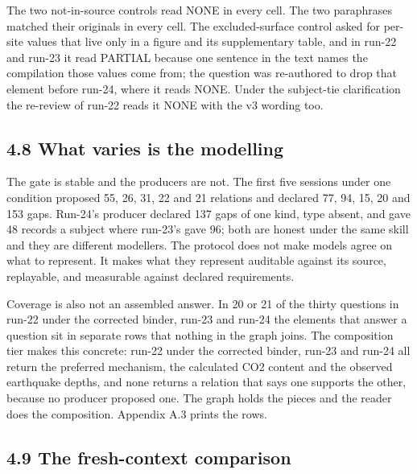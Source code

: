 The two not-in-source controls read NONE in every cell. The two paraphrases matched their originals in every cell. The excluded-surface control asked for per-site values that live only in a figure and its supplementary table, and in run-22 and run-23 it read PARTIAL because one sentence in the text names the compilation those values come from; the question was re-authored to drop that element before run-24, where it reads NONE. Under the subject-tie clarification the re-review of run-22 reads it NONE with the v3 wording too.

\subsection*{4.8 What varies is the modelling}

The gate is stable and the producers are not. The first five sessions under one condition proposed 55, 26, 31, 22 and 21 relations and declared 77, 94, 15, 20 and 153 gaps. Run-24's producer declared 137 gaps of one kind, type absent, and gave 48 records a subject where run-23's gave 96; both are honest under the same skill and they are different modellers. The protocol does not make models agree on what to represent. It makes what they represent auditable against its source, replayable, and measurable against declared requirements.

Coverage is also not an assembled answer. In 20 or 21 of the thirty questions in run-22 under the corrected binder, run-23 and run-24 the elements that answer a question sit in separate rows that nothing in the graph joins. The composition tier makes this concrete: run-22 under the corrected binder, run-23 and run-24 all return the preferred mechanism, the calculated CO2 content and the observed earthquake depths, and none returns a relation that says one supports the other, because no producer proposed one. The graph holds the pieces and the reader does the composition. Appendix A.3 prints the rows.

\subsection*{4.9 The fresh-context comparison}

